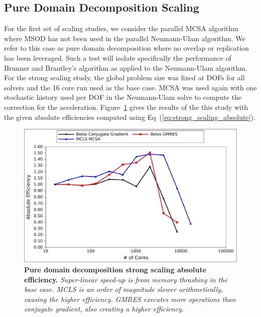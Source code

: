 \clearpage

\subsection{Pure Domain Decomposition Scaling}
\label{subsec:pure_domain_decomp}

For the first set of scaling studies, we consider the parallel MCSA
algorithm where MSOD has not been used in the parallel Neumann-Ulam
algorithm. We refer to this case as pure domain decomposition where no
overlap or replication has been leveraged. Such a test will isolate
specifically the performance of Brunner and Brantley's algorithm as
applied to the Neumann-Ulam algorithm. For the strong scaling study,
the global problem size was fixed at  DOFs for all solvers
and the 16 core run used as the base case. MCSA was used again with
one stochastic history used per DOF in the Neumann-Ulam solve to
compute the correction for the
acceleration. Figure~\ref{fig:titan_pure_strong} gives the results of
the this study with the given absolute efficiencies computed using
Eq~(\ref{eq:strong_scaling_absolute}).

\begin{figure}[t!]
  \begin{center}
    \includegraphics[width=6in]{chapters/parallel_mc/titan_pure_strong.pdf}
  \end{center}
  \caption{\textbf{Pure domain decomposition strong scaling absolute
      efficiency.}  \textit{Super-linear speed-up is from memory
      thrashing in the base case. MCLS is an order of magnitude slower
      arithmetically, causing the higher efficiency. GMRES executes
      more operations than conjugate gradient, also creating a higher
      efficiency.}}
  \label{fig:titan_pure_strong}
\end{figure}

